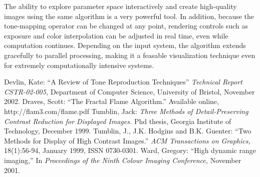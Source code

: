 \documentclass[letterpaper, 11pt]{article}
\begin{document}
The ability to explore parameter space interactively and create high-quality images
using the same algorithm is a very powerful tool.  In addition, because the tone-mapping
operator can be changed at any point, rendering controls such as exposure and color
interpolation can be adjusted in real time, even while computation continues. Depending
on the input system, the algorithm extends gracefully to parallel processing, making
it a feasable visualization technique even for extremely computationally intensive
systems.

\begin{thebibliography}{77}
 Devlin, Kate: ``A Review of Tone Reproduction Techniques'' {\it Technical Report CSTR-02-005,} Department of Computer Science, University of Bristol, November 2002.
 Draves, Scott: ``The Fractal Flame Algorithm.'' Available online, http://flam3.com/flame.pdf
 Tumblin, Jack: {\it Three Methods of Detail-Preserving Contrast Reduction for Displayed Images.} Phd thesis, Georgia Institute of Technology, December 1999.
 Tumblin, J., J.K. Hodgins and B.K. Guenter: ``Two Methods for Display of High Contrast Images.'' {\it ACM Transactions on Graphics,} 18(1):56-94, January 1999, ISSN 0730-0301.
 Ward, Gregory: ``High dynamic range imaging,'' In {\it Proceedings of the Ninth Colour Imaging Conference,} November 2001.
\end{thebibliography}
\end{document}
